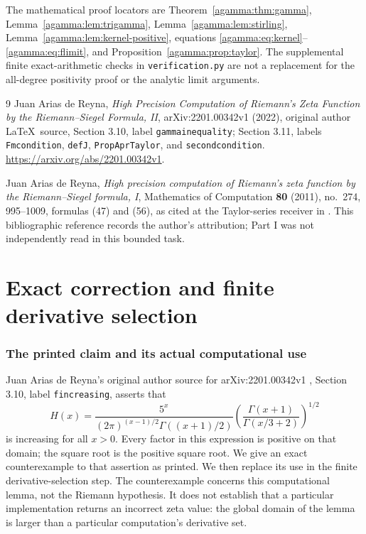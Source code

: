 \documentclass[11pt]{article}
\begin{document}
The mathematical proof locators are
Theorem~\ref{agamma:thm:gamma}, Lemma~\ref{agamma:lem:trigamma},
Lemma~\ref{agamma:lem:stirling}, Lemma~\ref{agamma:lem:kernel-positive},
equations \eqref{agamma:eq:kernel}--\eqref{agamma:eq:flimit}, and
Proposition~\ref{agamma:prop:taylor}. The supplemental finite exact-arithmetic
checks in \texttt{verification.py} are not a replacement for the
all-degree positivity proof or the analytic limit arguments.

\begin{thebibliography}{9}
Juan Arias de Reyna,
\emph{High Precision Computation of Riemann's Zeta Function by the
Riemann--Siegel Formula, II}, arXiv:2201.00342v1 (2022), original
author \LaTeX\ source, Section 3.10, label \texttt{gammainequality};
Section 3.11, labels \texttt{Fmcondition}, \texttt{defJ},
\texttt{PropAprTaylor}, and \texttt{secondcondition}.
\url{https://arxiv.org/abs/2201.00342v1}.

Juan Arias de Reyna,
\emph{High precision computation of Riemann's zeta function by the
Riemann--Siegel formula, I}, Mathematics of Computation
\textbf{80} (2011), no.~274, 995--1009, formulas (47) and (56),
as cited at the Taylor-series receiver in \cite{agamma:AriasII}.
This bibliographic reference records the author's attribution;
Part I was not independently read in this bounded task.
\end{thebibliography}

\endgroup

\clearpage\begingroup
\part*{Exact correction and finite derivative selection}
\newtheorem{aderivativetheorem}{Theorem}
\newtheorem{aderivativeproposition}[aderivativetheorem]{Proposition}
\newtheorem{aderivativelemma}[aderivativetheorem]{Lemma}
\newcommand{\aderivativeeps}{\varepsilon}



\section{The printed claim and its actual computational use}
\label{aderivative:sec:source}
Juan Arias de Reyna's original author source for
arXiv:2201.00342v1 \cite{aderivative:AriasII}, Section 3.10, label
\texttt{fincreasing}, asserts that
\begin{equation}\label{aderivative:eq:H}
H(x)=\frac{5^x}{(2\pi)^{(x-1)/2}\Gamma((x+1)/2)}
\left(\frac{\Gamma(x+1)}{\Gamma(x/3+2)}\right)^{1/2}
\end{equation}
is increasing for all $x>0$. Every factor in this expression is
positive on that domain; the square root is the positive square root.
We give an exact counterexample to that assertion as printed.
We then replace its use in the finite derivative-selection step.
The counterexample concerns this computational lemma, not the
Riemann hypothesis. It does not establish that a particular
implementation returns an incorrect zeta value: the global domain
of the lemma is larger than a particular computation's derivative set.
\end{document}
